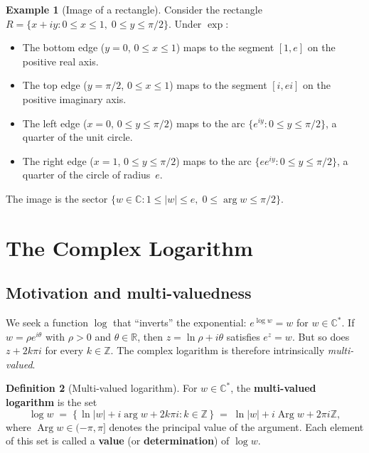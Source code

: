 \documentclass[12pt,a4paper,openany]{book}
\theoremstyle{definition}
\newtheorem{definition}{Definition}[chapter]
\newtheorem{example}[definition]{Example}
\theoremstyle{plain}
\theoremstyle{remark}
\newcommand{\C}{\mathbb{C}}
\newcommand{\R}{\mathbb{R}}
\newcommand{\Z}{\mathbb{Z}}
\DeclareMathOperator{\Arg}{Arg}
\newcommand{\abs}[1]{\left|#1\right|}
\begin{document}
\begin{example}[Image of a rectangle]\label{ex:exp-rectangle}
Consider the rectangle $R = \{x+iy : 0\le x\le 1,\;0\le y\le\pi/2\}$.
Under $\exp$:
\begin{itemize}
  \item The bottom edge ($y=0$, $0\le x\le 1$) maps to the segment
    $[1,e]$ on the positive real axis.
  \item The top edge ($y=\pi/2$, $0\le x\le 1$) maps to the segment
    $[i,ei]$ on the positive imaginary axis.
  \item The left edge ($x=0$, $0\le y\le\pi/2$) maps to the arc
    $\{e^{iy}: 0\le y\le\pi/2\}$, a quarter of the unit circle.
  \item The right edge ($x=1$, $0\le y\le\pi/2$) maps to the arc
    $\{ee^{iy}: 0\le y\le\pi/2\}$, a quarter of the circle of radius~$e$.
\end{itemize}
The image is the sector
$\{w\in\C : 1\le\abs{w}\le e,\;0\le\arg w\le\pi/2\}$.
\end{example}

\section{The Complex Logarithm}
\label{sec:complex-log}

\subsection{Motivation and multi-valuedness}

We seek a function $\log$ that ``inverts'' the exponential: $e^{\log w} = w$
for $w\in\C^*$.  If $w = \rho e^{i\theta}$ with $\rho>0$ and
$\theta\in\R$, then $z = \ln\rho + i\theta$ satisfies $e^z = w$.  But so does
$z + 2k\pi i$ for every $k\in\Z$.  The complex logarithm is therefore
intrinsically \emph{multi-valued}.

\begin{definition}[Multi-valued logarithm]\label{def:log-multivalued}
For $w\in\C^*$, the \textbf{multi-valued logarithm}
is the set
\[
  \log w \;=\; \bigl\{\,\ln\abs{w} + i\arg w + 2k\pi i : k\in\Z\,\bigr\}
         \;=\; \ln\abs{w} + i\Arg w + 2\pi i\Z,
\]
where $\Arg w\in(-\pi,\pi]$ denotes the principal value of the argument.
Each element of this set is called a \textbf{value} (or \textbf{determination})
of $\log w$.
\end{definition}
\end{document}

